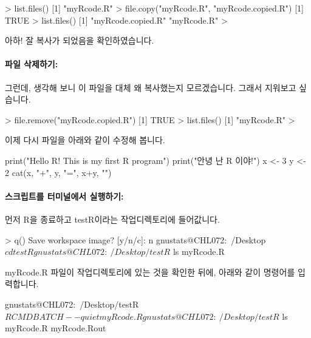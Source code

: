 \begin{Schunk}
\begin{Soutput}
> list.files()
[1] "myRcode.R"
> file.copy("myRcode.R", "myRcode.copied.R")
[1] TRUE
> list.files()
[1] "myRcode.copied.R" "myRcode.R"       
> 
\end{Soutput}
\end{Schunk}

아하! 잘 복사가 되었음을 확인하였습니다.

\paragraph{파일 삭제하기:}
그런데, 생각해 보니 이 파일을 대체 왜 복사했는지 모르겠습니다. 
그래서 지워보고 싶습니다. 

\begin{Schunk}
\begin{Soutput}
> file.remove("myRcode.copied.R")
[1] TRUE
> list.files()
[1] "myRcode.R"
> 
\end{Soutput}
\end{Schunk}

이제 다시 파일을 아래와 같이 수정해 봅니다. 
\begin{Schunk}
\begin{Soutput}
print("Hello R!  This is my first R program")
print("안녕 난 R 이야!")
x <- 3
y <- 2
cat(x, "+", y, "=", x+y, "\n")
\end{Soutput}
\end{Schunk}

\paragraph{스크립트를 터미널에서 실행하기: }

먼저 R을 종료하고 testR이라는 작업디렉토리에 들어값니다.  
\begin{Schunk}
\begin{Soutput}
> q()
Save workspace image? [y/n/c]: n
gnustats@CHL072:~/Desktop$ cd testR
gnustats@CHL072:~/Desktop/testR$ ls
myRcode.R
\end{Soutput}
\end{Schunk}

myRcode.R 파일이 작업디렉토리에 있는 것을 확인한 뒤에, 아래와 같이 명령어를 입력합니다. 

\begin{Schunk}
\begin{Soutput}
gnustats@CHL072:~/Desktop/testR$ R CMD BATCH --quiet myRcode.R
gnustats@CHL072:~/Desktop/testR$ ls
myRcode.R  myRcode.Rout
\end{Soutput}
\end{Schunk}

